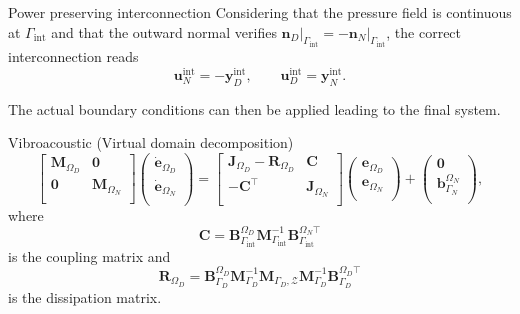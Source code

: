 \documentclass[aspectratio=169]{ISAE-Beamer}
\begin{document}
\begin{frame}{Power preserving interconnection}
Considering that the pressure field is continuous at $\Gamma_{\text{int}}$ and that the outward normal verifies $\bm{n}_D \vert_{\Gamma_{\text{int}}}= - \bm{n}_N \vert_{\Gamma_{\text{int}}}$, the correct interconnection reads 
\begin{equation*}
\mathbf{u}_N^{\text{int}} = - \mathbf{y}_D^{\text{int}}, \qquad
\mathbf{u}_D^{\text{int}} = \mathbf{y}_N^{\text{int}}.
\end{equation*}

The actual boundary conditions can then be applied leading to the final system.

\begin{block}{Vibroacoustic (Virtual domain decomposition)}
\setlength{\abovedisplayskip}{1pt}
\setlength{\belowdisplayskip}{1pt}
\begin{equation*}
\begin{bmatrix}
\mathbf{M}_{\Omega_D} & \mathbf{0} \\
\mathbf{0} & \mathbf{M}_{\Omega_N} \\
\end{bmatrix}
\begin{pmatrix}
\dot{\mathbf{e}}_{\Omega_D} \\
\dot{\mathbf{e}}_{\Omega_N} \\
\end{pmatrix}
= \begin{bmatrix}
\mathbf{J}_{\Omega_D} - \mathbf{R}_{\Omega_D}  & \mathbf{C}\\
-\mathbf{C}^\top & \mathbf{J}_{\Omega_N} \\
\end{bmatrix} 
\begin{pmatrix}
{\mathbf{e}}_{\Omega_D} \\
{\mathbf{e}}_{\Omega_N} \\
\end{pmatrix} + 
\begin{pmatrix}
\mathbf{0}\\
\mathbf{b}_{\Gamma_N}^{\Omega_N}\\
\end{pmatrix},
\end{equation*}
where 
\[\mathbf{C} = \mathbf{B}_{\Gamma_{\text{int}}}^{\Omega_D} \mathbf{M}_{\Gamma_{\text{int}}}^{-1} \mathbf{B}_{\Gamma_{\text{int}}}^{\Omega_N \top}\]
is the coupling matrix and
\[
\mathbf{R}_{\Omega_D} = \mathbf{B}_{\Gamma_D}^{\Omega_D} \mathbf{M}_{\Gamma_D}^{-1} \mathbf{M}_{\Gamma_D, \mathcal{Z}} \mathbf{M}_{\Gamma_D}^{-1} \mathbf{B}_{\Gamma_D}^{\Omega_D \top}
\]
is the dissipation matrix.
\end{block}

\end{frame}
\end{document}
